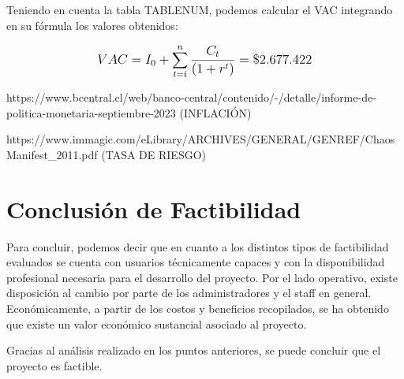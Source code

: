 Teniendo en cuenta la tabla TABLENUM, podemos calcular el VAC integrando en su fórmula los valores obtenidos:

\[
\mathlarger{
	{VAC} = I_0 + \sum\limits_{t=i}^{n}\frac{C_t}{\left(1+r^t\right)} = \$2.677.422
}
\]


https://www.bcentral.cl/web/banco-central/contenido/-/detalle/informe-de-politica-monetaria-septiembre-2023 (INFLACIÓN)

https://www.immagic.com/eLibrary/ARCHIVES/GENERAL/GENREF/ChaosManifest\_2011.pdf (TASA DE RIESGO)

\section{Conclusión de Factibilidad}
Para concluir, podemos decir que en cuanto a los distintos tipos de factibilidad evaluados se cuenta con usuarios técnicamente capaces y con la disponibilidad profesional necesaria para el desarrollo del proyecto. Por el lado operativo, existe disposición al cambio por parte de los administradores y el staff en general. Económicamente, a partir de los costos y beneficios recopilados, se ha obtenido que existe un valor económico sustancial asociado al proyecto.

Gracias al análisis realizado en los puntos anteriores, se puede concluir que el proyecto es factible.
